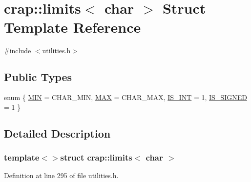 \hypertarget{structcrap_1_1limits_3_01char_01_4}{\section{crap\+:\+:limits$<$ char $>$ Struct Template Reference}
\label{structcrap_1_1limits_3_01char_01_4}
}


{\ttfamily \#include $<$utilities.\+h$>$}

\subsection*{Public Types}
\begin{DoxyCompactItemize}
\item 
enum \{ \hyperlink{structcrap_1_1limits_3_01char_01_4_aab3bbd4ed213fe6daf99e720c72da964a6f881f6c22400e8345d0ddb03e97b986}{M\+I\+N} = C\+H\+A\+R\+\_\+\+M\+I\+N, 
\hyperlink{structcrap_1_1limits_3_01char_01_4_aab3bbd4ed213fe6daf99e720c72da964acf7c4799d0f0d9ac15715d2a006d92d3}{M\+A\+X} = C\+H\+A\+R\+\_\+\+M\+A\+X, 
\hyperlink{structcrap_1_1limits_3_01char_01_4_aab3bbd4ed213fe6daf99e720c72da964afeb7edc497fa8bc9ba26ff3f0c0083b1}{I\+S\+\_\+\+I\+N\+T} = 1, 
\hyperlink{structcrap_1_1limits_3_01char_01_4_aab3bbd4ed213fe6daf99e720c72da964a8a3133501bca3b7b3bade69e4af680cc}{I\+S\+\_\+\+S\+I\+G\+N\+E\+D} = 1
 \}
\end{DoxyCompactItemize}


\subsection{Detailed Description}
\subsubsection*{template$<$$>$struct crap\+::limits$<$ char $>$}



Definition at line 295 of file utilities.\+h.



